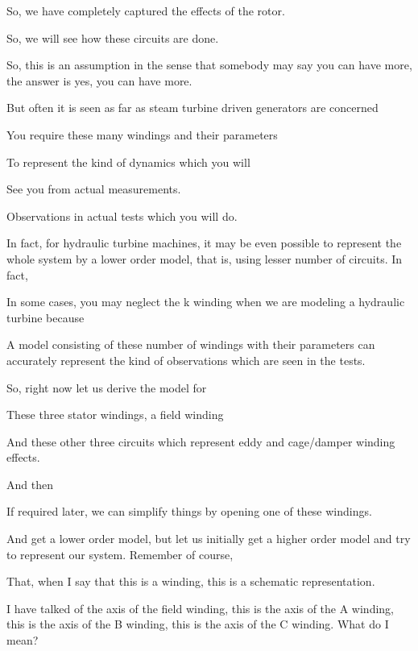 \documentclass{article}
\begin{document}
So, we have completely captured the effects of the rotor.

So, we will see how these circuits are done.

So, this is an assumption in the sense that somebody may say you can have more, the answer is yes, you can have more.

But often it is seen as far as steam turbine driven generators are concerned

You require these many windings and their parameters

To represent the kind of dynamics which you will

See you from actual measurements.

Observations in actual tests which you will do.

In fact, for hydraulic turbine machines, it may be even possible to represent the whole system by a lower order model, that is, using lesser number of circuits. In fact,

In some cases, you may neglect the k winding when we are modeling a hydraulic turbine because

A model consisting of these number of windings with their parameters can accurately represent the kind of observations which are seen in the tests.

So, right now let us derive the model for

These three stator windings, a field winding

And these other three circuits which represent eddy and cage/damper winding effects.

And then

If required later, we can simplify things by opening one of these windings.

And get a lower order model, but let us initially get a higher order model and try to represent our system. Remember of course,

That, when I say that this is a winding, this is a schematic representation.

I have talked of the axis of the field winding, this is the axis of the A winding, this is the axis of the B winding, this is the axis of the C winding. What do I mean?
\end{document}
